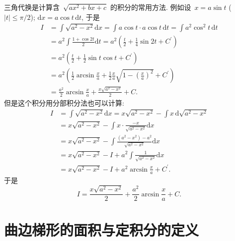 \documentclass[12pt]{ctexbook}
\theoremstyle{definition}
\theoremstyle{remark}
\begin{document}
三角代换是计算含~$\sqrt
{ax^{2}+bx+c}$
的积分的常用方法.
例如设~$x=a\sin t$ ($\left\vert t\right\vert \leq\pi/2$);
$\mathrm{d}x=a\cos t\,\mathrm{d}t$, 于是\begin{align}
I  &  =\int\sqrt{a^{2}-x^{2}}\mathrm{d}x=\int a\cos t\cdot a\cos
t\,\mathrm{d}t=\int a^{2}\cos^{2}t\,\mathrm{d}t\tag{$a>0$}\\
&  =a^{2}\int\frac{1+\cos2t}{2}\mathrm{d}t=a^{2}\left(  \frac{t}{2}+\frac
{1}{4}\sin2t+C^{\prime}\right) \nonumber\\
&  =a^{2}\left(  \frac{t}{2}+\frac{1}{2}\sin t\cos t+C^{\prime}\right)
\nonumber\\
&  =a^{2}\left(  \frac{1}{2}\arcsin\frac{x}{a}+\frac{1}{2}\frac{x}{a}%
\sqrt{1-\left(  \frac{x}{a}\right)  ^{2}}+C^{\prime}\right) \nonumber\\
&  =\frac{a^{2}}{2}\arcsin\frac{x}{a}+\frac{x\sqrt{a^{2}-x^{2}}}{2}%
+C\text{.}\nonumber
\end{align}
但是这个积分用分部积分法也可以计算:%
\begin{align*}
I  &  =\int\sqrt{a^{2}-x^{2}}\mathrm{d}x=x\sqrt{a^{2}-x^{2}}-\int
x\,\mathrm{d}\sqrt{a^{2}-x^{2}}\\
&  =x\sqrt{a^{2}-x^{2}}-\int x\cdot\frac{-x}{\sqrt{a^{2}-x^{2}}}\mathrm{d}x\\
&  =x\sqrt{a^{2}-x^{2}}-\int\frac{\left(  a^{2}-x^{2}\right)  -a^{2}}%
{\sqrt{a^{2}-x^{2}}}\mathrm{d}x\\
&  =x\sqrt{a^{2}-x^{2}}-I+a^{2}\int\frac{1}{\sqrt{a^{2}-x^{2}}}\mathrm{d}x\\
&  =x\sqrt{a^{2}-x^{2}}-I+a^{2}\arcsin\frac{x}{a}+C^{\prime}\text{.}%
\end{align*}
于是\[
I=\frac{x\sqrt{a^{2}-x^{2}}}{2}+\frac{a^{2}}{2}\arcsin\frac{x}{a}+C\text{.}%
\]


\section{曲边梯形的面积与定积分的定义}%
\end{document}
